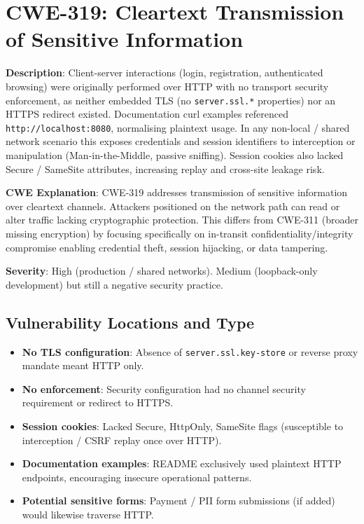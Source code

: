 \documentclass[]{UCD_CS_FYP_Report}
\begin{document}
\section{CWE-319: Cleartext Transmission of Sensitive Information}

	\textbf{Description}: Client-server interactions (login, registration, authenticated browsing) were originally performed over HTTP with no transport security enforcement, as neither embedded TLS (no \texttt{server.ssl.*} properties) nor an HTTPS redirect existed. Documentation curl examples referenced \texttt{http://localhost:8080}, normalising plaintext usage. In any non-local / shared network scenario this exposes credentials and session identifiers to interception or manipulation (Man-in-the-Middle, passive sniffing). Session cookies also lacked Secure / SameSite attributes, increasing replay and cross-site leakage risk.

	\textbf{CWE Explanation}: CWE-319 addresses transmission of sensitive information over cleartext channels. Attackers positioned on the network path can read or alter traffic lacking cryptographic protection. This differs from CWE-311 (broader missing encryption) by focusing specifically on in-transit confidentiality/integrity compromise enabling credential theft, session hijacking, or data tampering.

	\textbf{Severity}: High (production / shared networks). Medium (loopback-only development) but still a negative security practice.

\subsection*{Vulnerability Locations and Type}
\begin{itemize}
	\item \textbf{No TLS configuration}: Absence of \texttt{server.ssl.key-store} or reverse proxy mandate meant HTTP only.
	\item \textbf{No enforcement}: Security configuration had no channel security requirement or redirect to HTTPS.
	\item \textbf{Session cookies}: Lacked Secure, HttpOnly, SameSite flags (susceptible to interception / CSRF replay once over HTTP).
	\item \textbf{Documentation examples}: README exclusively used plaintext HTTP endpoints, encouraging insecure operational patterns.
	\item \textbf{Potential sensitive forms}: Payment / PII form submissions (if added) would likewise traverse HTTP.
\end{itemize}
\end{document}
